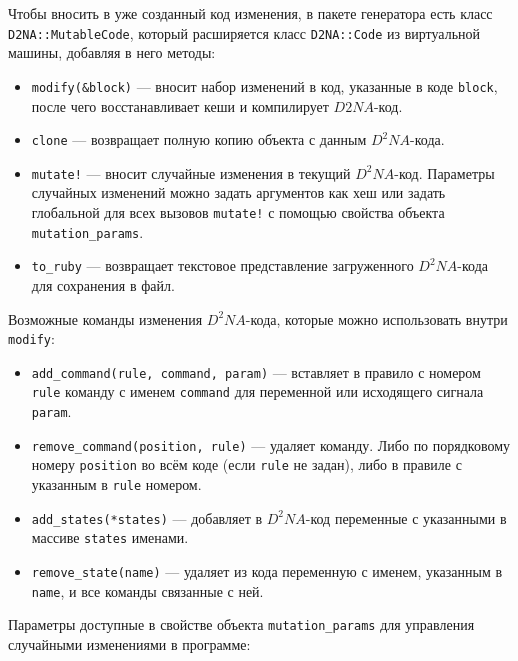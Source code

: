\documentclass[utf8,a5paper,portrait,12pt]{eskdtext}
\begin{document}
Чтобы вносить в уже созданный код изменения, в пакете генератора есть класс
\texttt{D2NA::MutableCode}, который расширяется класс \texttt{D2NA::Code} из
виртуальной машины, добавляя в него методы:
\begin{itemize}
  \item \texttt{modify(\&block)} — вносит набор изменений в код, указанные в
        коде \texttt{block}, после чего восстанавливает кеши и компилирует
        $D2NA$-код.
  \item \texttt{clone} — возвращает полную копию объекта с данным $D^2NA$-кода.
  \item \texttt{mutate!} — вносит случайные изменения в текущий $D^2NA$-код.
        Параметры случайных изменений можно задать аргументов как хеш или
        задать глобальной для всех вызовов \texttt{mutate!} с помощью свойства
        объекта \texttt{mutation\_params}.
  \item \texttt{to\_ruby} — возвращает текстовое представление загруженного
        $D^2NA$-кода для сохранения в файл.
\end{itemize}

Возможные команды изменения $D^2NA$-кода, которые можно использовать
внутри \texttt{modify}:
\begin{itemize}
  \item \texttt{add\_command(rule, command, param)} — вставляет в
        правило с номером \texttt{rule} команду с именем
        \texttt{command} для переменной или исходящего сигнала
        \texttt{param}.
  \item \texttt{remove\_command(position, rule)} — удаляет команду. Либо по
        порядковому номеру \texttt{position} во всём коде (если \texttt{rule}
        не задан), либо в правиле с указанным в \texttt{rule} номером.
  \item \texttt{add\_states(*states)} — добавляет в $D^2NA$-код переменные с
        указанными в массиве \texttt{states} именами.
  \item \texttt{remove\_state(name)} — удаляет из кода переменную с именем,
        указанным в \texttt{name}, и все команды связанные с ней.
\end{itemize}

Параметры доступные в свойстве объекта \texttt{mutation\_params} для управления
случайными изменениями в программе:
\end{document}

